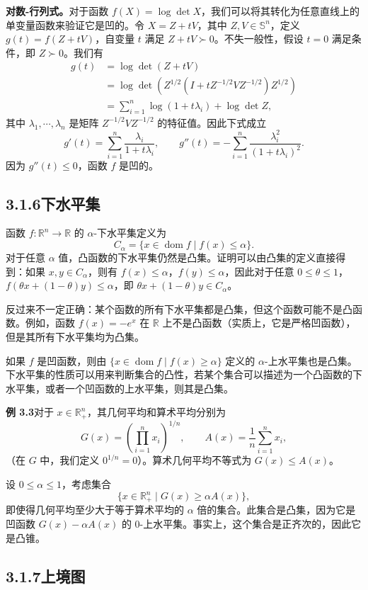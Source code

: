\documentclass[UTF8,12pt,a4paper,fontset=fandol]{ctexart}
\DeclareMathOperator{\dom}{dom}
\begin{document}
\noindent\textbf{对数-行列式。}\quad 对于函数 $f(X)=\log\det X$，我们可以将其转化为任意直线上的单变量函数来验证它是凹的。令 $X=Z+tV$，其中 $Z,V\in\mathbb{S}^n$，定义 $g(t)=f(Z+tV)$，自变量 $t$ 满足 $Z+tV\succ0$。不失一般性，假设 $t=0$ 满足条件，即 $Z\succ0$。我们有
\[
\begin{aligned}
g(t)&=\log\det(Z+tV)\\
&=\log\det\left(Z^{1/2}(I+tZ^{-1/2}VZ^{-1/2})Z^{1/2}\right)\\
&=\sum_{i=1}^n\log(1+t\lambda_i)+\log\det Z,
\end{aligned}
\]
其中 $\lambda_1,\cdots,\lambda_n$ 是矩阵 $Z^{-1/2}VZ^{-1/2}$ 的特征值。因此下式成立
\[
g'(t)=\sum_{i=1}^n\frac{\lambda_i}{1+t\lambda_i},\qquad
g''(t)=-\sum_{i=1}^n\frac{\lambda_i^2}{(1+t\lambda_i)^2}.
\]
因为 $g''(t)\leq0$，函数 $f$ 是凹的。

\subsection*{3.1.6\quad 下水平集}

函数 $f:\mathbb{R}^n\to\mathbb{R}$ 的 $\alpha$-下水平集定义为
\[
C_\alpha=\{x\in\dom f\mid f(x)\leq\alpha\}.
\]
对于任意 $\alpha$ 值，凸函数的下水平集仍然是凸集。证明可以由凸集的定义直接得到：如果 $x,y\in C_\alpha$，则有 $f(x)\leq\alpha$，$f(y)\leq\alpha$，因此对于任意 $0\leq\theta\leq1$，$f(\theta x+(1-\theta)y)\leq\alpha$，即 $\theta x+(1-\theta)y\in C_\alpha$。

反过来不一定正确：某个函数的所有下水平集都是凸集，但这个函数可能不是凸函数。例如，函数 $f(x)=-e^x$ 在 $\mathbb{R}$ 上不是凸函数（实质上，它是严格凹函数），但是其所有下水平集均为凸集。

如果 $f$ 是凹函数，则由 $\{x\in\dom f\mid f(x)\geq\alpha\}$ 定义的 $\alpha$-上水平集也是凸集。下水平集的性质可以用来判断集合的凸性，若某个集合可以描述为一个凸函数的下水平集，或者一个凹函数的上水平集，则其是凸集。

\noindent\textbf{例 3.3}\quad 对于 $x\in\mathbb{R}_+^n$，其几何平均和算术平均分别为
\[
G(x)=\left(\prod_{i=1}^n x_i\right)^{1/n},\qquad
A(x)=\frac{1}{n}\sum_{i=1}^n x_i,
\]
（在 $G$ 中，我们定义 $0^{1/n}=0$）。算术几何平均不等式为 $G(x)\leq A(x)$。

设 $0\leq\alpha\leq1$，考虑集合
\[
\{x\in\mathbb{R}_+^n\mid G(x)\geq \alpha A(x)\},
\]
即使得几何平均至少大于等于算术平均的 $\alpha$ 倍的集合。此集合是凸集，因为它是凹函数 $G(x)-\alpha A(x)$ 的 $0$-上水平集。事实上，这个集合是正齐次的，因此它是凸锥。

\subsection*{3.1.7\quad 上境图}
\end{document}
